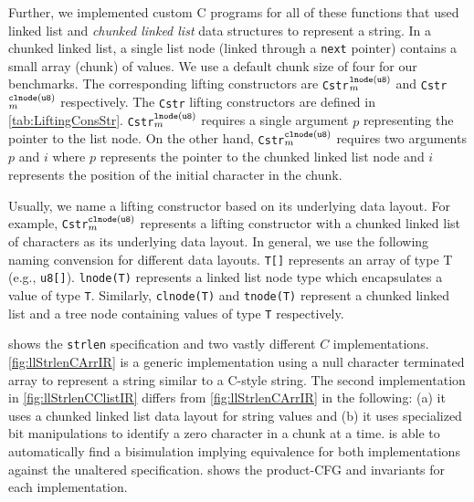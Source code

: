Further, we implemented
custom C programs for all of these functions that used
linked list
and {\em chunked linked list} data structures
to represent a string.
In a chunked linked list, a single list node (linked
through a {\tt next} pointer)
contains a small array (chunk) of values.
We use a default chunk size of four for our
benchmarks.
The corresponding lifting constructors are {\tt Cstr}$^{\tt lnode(u8)}_m$
and {\tt Cstr}$^{\tt clnode(u8)}_m$ respectively.
The {\tt Cstr} lifting constructors are defined in \cref{tab:LiftingConsStr}.
{\tt Cstr}$^{\tt lnode(u8)}_m$ requires a single
argument $p$ representing the pointer to the list node.
On the other hand, {\tt Cstr}$^{\tt clnode(u8)}_m$ requires two arguments $p$
and $i$ where $p$ represents the pointer to the chunked linked list node
and $i$ represents the position of the initial character in the chunk.

Usually, we name a lifting constructor based on its underlying data layout.
For example, {\tt Cstr}$^{\tt clnode(u8)}_m$ represents a lifting constructor
with a chunked linked list of characters as its underlying data layout.
In general, we use the following naming convension for different data layouts.
{\tt T[]} represents an array of type T (e.g., {\tt u8[]}).
{\tt lnode(T)} represents a  linked list node type which encapsulates a value of type {\tt T}.
Similarly, {\tt clnode(T)} and {\tt tnode(T)} represent a chunked linked list and a tree node
containing values of type {\tt T} respectively.



 shows the {\tt strlen} specification and two vastly
different $C$ implementations. \cref{fig:llStrlenCArrIR} is a generic implementation
using a null character terminated array to represent a string similar to a C-style string.
The second implementation in \cref{fig:llStrlenCClistIR} differs from \cref{fig:llStrlenCArrIR}
in the following: (a) it uses a chunked linked list data layout for string values
and (b) it uses specialized bit manipulations to identify a zero character in a chunk at a time.
\toolName{} is able to automatically find a bisimulation implying equivalence
for both implementations against the unaltered specification.
 shows the product-CFG and invariants for each implementation.


\vspace{-10px}
